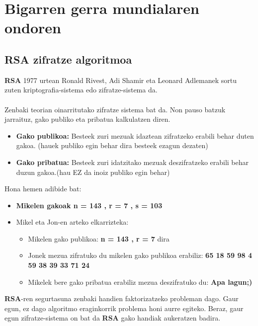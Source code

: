 \documentclass[12pt]{basque-book}
\begin{document}
\section{Bigarren gerra mundialaren ondoren}
\subsection{RSA zifratze algoritmoa}
\textbf{RSA} 1977 urtean Ronald Rivest, Adi Shamir eta Leonard Adlemanek sortu zuten kriptografia-sistema edo zifratze-sistema da.
\\\\
Zenbaki teorian oinarritutako zifratze sistema bat da. Non pauso batzuk jarraituz, gako publiko eta pribatua kalkulatzen diren.
\begin{itemize}
    \item \textbf{Gako publikoa:} Besteek zuri mezuak idaztean zifratzeko erabili behar duten gakoa.
    (hauek publiko egin behar dira besteek ezagun dezaten)
    \item \textbf{Gako pribatua:} Besteek zuri idatzitako mezuak deszifratzeko erabili behar duzun gakoa.(hau EZ da inoiz publiko egin behar)
\end{itemize}
Hona hemen adibide bat:
\begin{itemize}
    \item \textbf{Mikelen gakoak n =  143 , r =  7 , s = 103}
    \item Mikel eta Jon-en arteko elkarrizteka:
    \begin{itemize}
    \item Mikelen gako publikoa:
    \textbf{n =  143 , r =  7} dira
    \item Jonek mezua zifratuko du mikelen gako publikoa erabiliz:\newline
    \textbf{65 18 59 98  4 59 38 39 33 71 24}
    \item Mikelek bere gako pribatua erabiliz mezua deszifratuko du:\newline
    \textbf{Apa lagun;)}
    \end{itemize}
\end{itemize}
\textbf{RSA}-ren segurtasuna zenbaki handien faktorizatzeko probleman dago. Gaur egun, ez dago algoritmo eraginkorrik problema honi aurre egiteko. Beraz, gaur egun zifratze-sistema on bat da \textbf{RSA} gako handiak aukeratzen badira.
\end{document}
